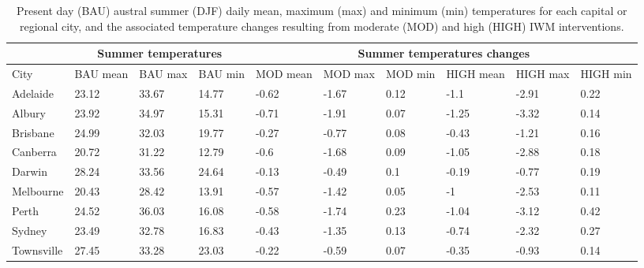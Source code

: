 \documentclass[utf8]{frontiersSCNS} %
\begin{document}
\setlength\arrayrulewidth{1pt} %
\begin{table}[!ht]\caption{Present day (BAU) austral summer (DJF) daily mean, maximum (max) and minimum (min) temperatures for each capital or regional city, and the associated temperature changes resulting from moderate (MOD) and high (HIGH) IWM interventions.}
    \centering
    \small
    \begin{tabular}{|p{1.7cm}|p{1.0cm}|p{1.0cm}|p{1.0cm}|p{1.0cm}|p{1.0cm}|p{1.0cm}|p{1.0cm}|p{1.0cm}|p{1.0cm}|}
    \hline
        \rowcolor{dark-blue}\multicolumn{1}{c|}{} & \multicolumn{3}{c|}{Summer temperatures} & \multicolumn{6}{c|}{Summer temperatures changes} \\ \hline
        \rowcolor{dark-blue}City & BAU mean & BAU max & BAU   min & MOD       mean & MOD       max & MOD        min & HIGH      mean & HIGH      max & HIGH        min \\ \hline    
		\rowcolor{light-gray}Adelaide & 23.12 & 33.67 & 14.77 & -0.62 & -1.67 & 0.12 & -1.1 & -2.91 & 0.22 \\ \hline
        \rowcolor{light-blue!25}Albury & 23.92 & 34.97 & 15.31 & -0.71 & -1.91 & 0.07 & -1.25 & -3.32 & 0.14 \\ \hline
        \rowcolor{light-gray}Brisbane & 24.99 & 32.03 & 19.77 & -0.27 & -0.77 & 0.08 & -0.43 & -1.21 & 0.16 \\ \hline
        \rowcolor{light-blue!25}Canberra & 20.72 & 31.22 & 12.79 & -0.6 & -1.68 & 0.09 & -1.05 & -2.88 & 0.18 \\ \hline
        \rowcolor{light-gray}Darwin & 28.24 & 33.56 & 24.64 & -0.13 & -0.49 & 0.1 & -0.19 & -0.77 & 0.19 \\ \hline
        \rowcolor{light-blue!25}Melbourne & 20.43 & 28.42 & 13.91 & -0.57 & -1.42 & 0.05 & -1 & -2.53 & 0.11 \\ \hline
        \rowcolor{light-gray}Perth & 24.52 & 36.03 & 16.08 & -0.58 & -1.74 & 0.23 & -1.04 & -3.12 & 0.42 \\ \hline
        \rowcolor{light-blue!25}Sydney & 23.49 & 32.78 & 16.83 & -0.43 & -1.35 & 0.13 & -0.74 & -2.32 & 0.27 \\ \hline
        \rowcolor{light-gray}Townsville & 27.45 & 33.28 & 23.03 & -0.22 & -0.59 & 0.07 & -0.35 & -0.93 & 0.14 \\ \hline
    \end{tabular}\label{table:djf}
\end{table}
\setlength\arrayrulewidth{0.4pt} %
\end{document}
